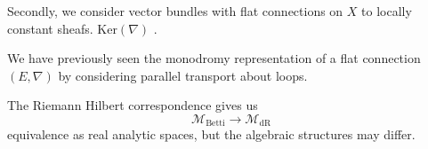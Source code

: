 Secondly, we consider vector bundles with flat connections on $X$ to locally constant sheafs. 
$ \mathrm{Ker}(\nabla) $ .

We have previously seen the monodromy representation of a flat connection $( E, \nabla ) $ 
by considering parallel transport about loops.

The Riemann Hilbert correspondence gives us
\begin{equation}
    \mathcal{M} _{\mbox{Betti}} \rightarrow \mathcal{M} _{\mbox{dR}} 
\end{equation}
equivalence as real analytic spaces, but the algebraic structures may differ. 









 

